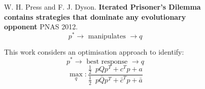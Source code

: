 \documentclass[usenames,dvipsnames,t]{beamer}
\begin{document}
\begin{columns}
    \begin{column}{.05\linewidth}
    \end{column}
    \begin{column}{.2\linewidth}
        \vspace{3cm}

        
    \end{column}
    \begin{column}{.3\linewidth}
    \vspace{-.5cm}
        \begin{center}
             \\
             \\
            
        \end{center}
    \end{column}
    \begin{column}{.1\linewidth}
        \vspace{2cm}

        
    \end{column}
    \begin{column}{.3\linewidth}
        \vspace{1cm}

        \small{
            W. H. Press and F. J. Dyson. \textbf{Iterated Prisoner’s
            Dilemma contains strategies that dominate any evolutionary opponent}
            PNAS 2012.%
            \[p ^ * \rightarrow \text{ manipulates } \rightarrow q\]
        }
        \vspace{1cm}

        \small{
        This work considers an optimisation approach to identify:
        \[ p ^ * \rightarrow \text{ best response } \rightarrow q\]}
        \normalsize{
         \[\max_q: \frac{\frac{1}{2}\enspace p  Q  p^T + c^T p + a}
                  {\frac{1}{2}\enspace  p  \bar{Q}  p^T + \bar{c}^T  p + \bar{a}}\]
            }
    \end{column}
    \begin{column}{.05\linewidth}
    \end{column}
\end{columns}
\vspace{1cm}
\end{document}
